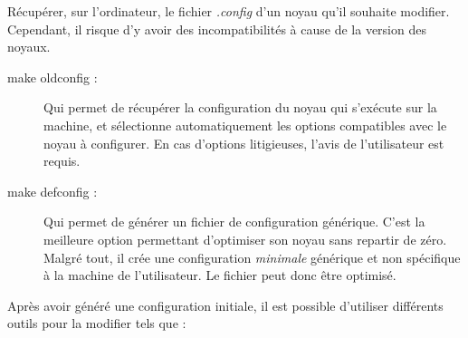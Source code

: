 \documentclass[17pts]{report}
\begin{document}
Récupérer, sur l'ordinateur, le fichier \textit{.config} d’un noyau qu'il
souhaite modifier. Cependant, il risque d’y avoir des incompatibilités à cause
de la version des noyaux.

\begin{description}
    \item[make oldconfig :] Qui permet de récupérer la configuration du noyau
        qui s'exécute sur la machine, et sélectionne automatiquement les
        options compatibles avec le noyau à configurer.  En cas d'options
        litigieuses, l'avis de l'utilisateur est requis.
    \item[make defconfig :] Qui permet de générer un fichier de configuration
        générique. C’est la meilleure option permettant d’optimiser son noyau
        sans repartir de zéro. Malgré tout, il crée une configuration
        \textit{minimale} générique et non spécifique à la machine de
        l’utilisateur.  Le fichier peut donc être optimisé.
\end{description}

Après avoir généré une configuration initiale, il est possible d’utiliser
différents outils pour la modifier tels que :
\end{document}
